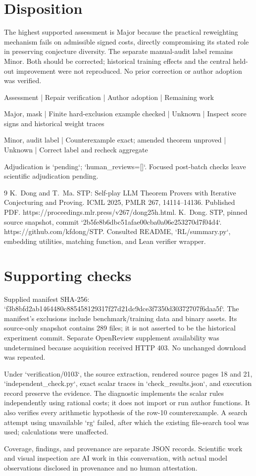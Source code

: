 \documentclass[10pt]{article}
\begin{document}
\section*{Disposition}
The highest supported assessment is Major because the practical reweighting mechanism fails on admissible signed costs, directly compromising its stated role in preserving conjecture diversity. The separate manual-audit label remains Minor. Both should be corrected; historical training effects and the central held-out improvement were not reproduced. No prior correction or author adoption was verified.\par
Assessment | Repair verification | Author adoption | Remaining work\par
Major, mask | Finite hard-exclusion example checked | Unknown | Inspect score signs and historical weight traces\par
Minor, audit label | Counterexample exact; amended theorem unproved | Unknown | Correct label and recheck aggregate\par
Adjudication is `pending`; `human\_reviews=[]`. Focused post-batch checks leave scientific adjudication pending.\par
9 K. Dong and T. Ma. STP: Self-play LLM Theorem Provers with Iterative Conjecturing and Proving. ICML 2025, PMLR 267, 14114–14136. Published PDF. https://proceedings.mlr.press/v267/dong25h.html. K. Dong. STP, pinned source snapshot, commit `2b5fe8b6dbc51afae00cba0a06e253270d7f04d4`. https://github.com/kfdong/STP. Consulted README, `RL/summary.py`, embedding utilities, matching function, and Lean verifier wrapper.\par
\section*{Supporting checks}
Supplied manifest SHA-256: `f3b8bfd2ab1464480c885458129317f27d21dc9dce3f7350d30372707f6daa5f`. The manifest’s exclusions include benchmark/training data and binary assets. Its source-only snapshot contains 289 files; it is not asserted to be the historical experiment commit. Separate OpenReview supplement availability was undetermined because acquisition received HTTP 403. No unchanged download was repeated.\par
Under `verification/0103`, the source extraction, rendered source pages 18 and 21, `independent\_check.py`, exact scalar traces in `check\_results.json`, and execution record preserve the evidence. The diagnostic implements the scalar rules independently using rational costs; it does not import or run author functions. It also verifies every arithmetic hypothesis of the row-10 counterexample. A search attempt using unavailable `rg` failed, after which the existing file-search tool was used; calculations were unaffected.\par
Coverage, findings, and provenance are separate JSON records. Scientific work and visual inspection are AI work in this conversation, with actual model observations disclosed in provenance and no human attestation.\par
\end{document}
